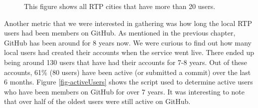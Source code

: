 \begin{figure}
\begin{center}
\caption{This figure shows all RTP cities that have more than 20 users.} 
\label{fig-userCountByCityBarChart}
\end{center}
\end{figure}

Another metric that we were interested in gathering was how long the local RTP users had been members on GitHub. As mentioned in the previous chapter, GitHub has been around for 8 years now. We were curious to find out how many local users had created their accounts when the service went live. There ended up being around 130 users that have had their accounts for 7-8 years. Out of these accounts, 61\% (80 users) have been active (or submitted a commit) over the last 6 months. Figure \ref{fig-activeUsers} shows the script used to determine active users who have been members on GitHub for over 7 years. It was interesting to note that over half of the oldest users were still active on GitHub.


